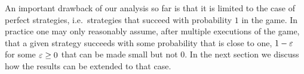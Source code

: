 An important drawback of our analysis so far is that it is limited to the case of perfect strategies, i.e.\ strategies that succeed with probability $1$ in the game. In practice one may only reasonably assume, after multiple executions of the game, that a given strategy succeeds with some probability that is close to one, $1-\varepsilon$ for some $\varepsilon\geq 0$ that can be made small but not $0$. In the next section we discuss how the results can be extended to that case. 








